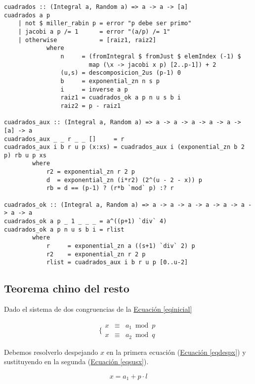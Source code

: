 \documentclass[10pt,spanish]{article}
\begin{document}
\begin{verbatim}
cuadrados :: (Integral a, Random a) => a -> a -> [a]
cuadrados a p
    | not $ miller_rabin p = error "p debe ser primo"
    | jacobi a p /= 1      = error "(a/p) /= 1"
    | otherwise            = [raiz1, raiz2]
            where
                n     = (fromIntegral $ fromJust $ elemIndex (-1) $ 
                        map (\x -> jacobi x p) [2..p-1]) + 2
                (u,s) = descomposicion_2us (p-1) 0
                b     = exponential_zn n s p
                i     = inverse a p
                raiz1 = cuadrados_ok a p n u s b i
                raiz2 = p - raiz1

cuadrados_aux :: (Integral a, Random a) => a -> a -> a -> a -> a -> [a] -> a
cuadrados_aux _ _ r _ _ []     = r
cuadrados_aux i b r u p (x:xs) = cuadrados_aux i (exponential_zn b 2 p) rb u p xs
        where
            r2 = exponential_zn r 2 p
            d  = exponential_zn (i*r2) (2^(u - 2 - x)) p
            rb = d == (p-1) ? (r*b `mod` p) :? r

cuadrados_ok :: (Integral a, Random a) => a -> a -> a -> a -> a -> a -> a -> a
cuadrados_ok a p _ 1 _ _ _ = a^((p+1) `div` 4)
cuadrados_ok a p n u s b i = rlist
        where
            r     = exponential_zn a ((s+1) `div` 2) p
            r2    = exponential_zn r 2 p
            rlist = cuadrados_aux i b r u p [0..u-2]
\end{verbatim}

\subsection{\textcolor{rojo}Teorema chino del resto}
Dado el sistema de dos congruencias de la \hyperref[eqinicial]{Ecuación \ref*{eqinicial}}

\begin{equation}
\label{eqinicial}
\Bigg\{ \begin{matrix}
    x & \equiv & a_1 \bmod p\\
    x & \equiv & a_2 \bmod q
\end{matrix}
\end{equation}

Debemos resolverlo despejando $x$ en la primera ecuación (\hyperref[eqdespx]{Ecuación \ref*{eqdespx}}) y sustituyendo en la segunda (\hyperref[eqsusx]{Ecuación \ref*{eqsusx}}).

\begin{equation}
\label{eqdespx}
    x = a_1 + p \cdot l
\end{equation}
\end{document}
